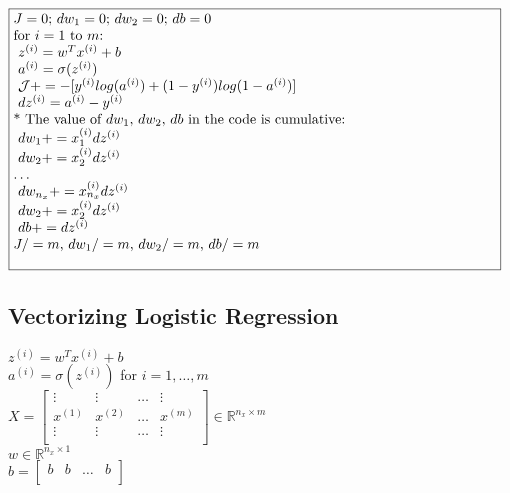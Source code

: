 \documentclass{article}
\begin{document}
$\noindent\fbox{%
\parbox{\textwidth}{%
$J=0$; $dw_1 = 0$; $dw_2 = 0$; $db=0$\\

for $i=1$ to $m$:\\
$\indent$ $z^{(i)} = w^T x^{(i)} + b$\\
$\indent$ $a^{(i)} = \sigma(z^{(i)})$\\
$\indent$ $\mathcal{J} += -[y^{(i)} log(a^{(i)}) + (1-y^{(i)})log(1-a^{(i)})]$\\
$\indent$ $dz^{(i)} = a^{(i)}- y^{(i)}$\\

* The value of $dw_1$, $dw_2$, $db$ in the code is cumulative:\\
$\indent$ $dw_1 += x_1^{(i)}dz^{(i)}$\\
$\indent$ $dw_2 += x_2^{(i)}dz^{(i)}$\\
$\dots$\\
$\indent$ $dw_{n_x} += x_{n_x}^{(i)}dz^{(i)}$\\

$\indent$ $dw_2 += x_2^{(i)}dz^{(i)}$\\
$\indent$ $db += dz^{(i)}$\\

$J/=m$,  $dw_1 /=m$,  $dw_2 /=m$,  $db /=m$\\

    }%
}$\\



\newpage
\subsection{Vectorizing Logistic Regression}

$z^{(i)} = w^T x^{(i)} + b$\\
$a^{(i)} = \sigma(z^{(i)})$ for $i=1, \dots, m$\\

$X =
\begin{bmatrix}
\vdots & \vdots & \dots & \vdots \\
x^{(1)} & x^{(2)} & \dots & x^{(m)}\\
\vdots & \vdots & \dots & \vdots \\
\end{bmatrix} \in \mathbb{R}^{n_x \times m}
$\\

$w \in \mathbb{R}^{n_x \times 1}$\\

$b =
\begin{bmatrix}
b & b & \dots & b\\
\end{bmatrix}
$\\
\end{document}
